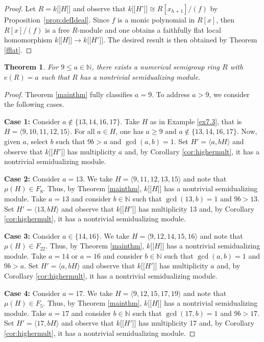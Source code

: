\documentclass{amsart}
\newcommand{\NN}{\mathbb N}
\newcommand{\ldb}{\mathopen{[\![}} %
\newcommand{\rdb}{\mathclose{]\!]}} %
\theoremstyle{plain}
\newtheorem{theorem}{Theorem}
\theoremstyle{definition}
\numberwithin{theorem}{section}
\numberwithin{equation}{section}
\numberwithin{equation}{theorem}
\begin{document}
\begin{proof} Let $R=k \ldb H \rdb$ and observe that $k \ldb H’ \rdb \cong R[x_{h+1}]/(f)$ by Proposition~\ref{prop:defIdeal}. 
Since $f$ is a monic polynomial in $R[x]$, then $R[x]/(f)$ is a free $R$-module and one obtains a faithfully flat local homomorphism $k \ldb H \rdb \to k \ldb H' \rdb$. The desired result is then obtained by Theorem \ref{fflat}.
\end{proof}


\begin{theorem}\label{cor:allmult}
For $9 \leq a \in \NN$, there exists a numerical semigroup ring $R$ with $e(R) = a$ such that $R$ has a nontrivial semidualizing module.
\end{theorem}

\begin{proof}
Theorem \ref{mainthm} fully classifies $a = 9$. To address $a >9$, we consider the following cases.

{\bf Case 1:} Consider $a \notin \{13,14,16,17\}$. Take $H$ as in Example \ref{ex7.3}, that is $H = \langle 9, 10, 11, 12, 15 \rangle$. For all $a \in H$, one has $a \geq 9$ and $a \notin \{13, 14, 16, 17\}$. Now, given $a$, select $b$ such that $9b > a$ and $\gcd(a,b) = 1$. Set $H' = \langle a, bH \rangle$ and observe that $k \ldb H' \rdb$ has multiplicity $a$ and, by Corollary \ref{cor:highermult}, it has a nontrivial semidualizing module.

{\bf Case 2:} Consider $a = 13$. We take $H = \langle 9, 11, 12, 13, 15 \rangle$ and note that $\mu(H) \in F_8$. Thus, by Theorem \ref{mainthm}, $k \ldb H \rdb$ has a nontrivial semidualizing module. Take $a = 13$ and consider $b \in \NN$ such that $\gcd(13,b) = 1$ and $9b > 13$. Set $H' = \langle 13, bH \rangle$ and observe that $k \ldb H' \rdb$ has multiplicity 13 and, by Corollary \ref{cor:highermult}, it has a nontrivial semidualizing module.

{\bf Case 3:} Consider $a \in \{14, 16\}$. We take $H =  \langle 9, 12, 14, 15, 16 \rangle$ and note that $\mu(H) \in F_{22}$. Thus, by Theorem \ref{mainthm}, $k \ldb H \rdb$ has a nontrivial semidualizing module. Take $a = 14$ or $a = 16$ and consider $b \in \NN$ such that $\gcd(a,b) = 1$ and $9b > a$. Set $H' = \langle a, bH \rangle$ and observe that $k \ldb H' \rdb$ has multiplicity $a$ and, by Corollary \ref{cor:highermult}, it has a nontrivial semidualizing module.

{\bf Case 4:} Consider $a = 17$. We take $H = \langle 9, 12, 15, 17, 19 \rangle$ and note that $\mu(H) \in F_5$. Thus, by Theorem \ref{mainthm}, $k \ldb H \rdb$ has a nontrivial semidualizing module. Take $a = 17$ and consider $b \in \NN$ such that $\gcd(17,b) = 1$ and $9b > 17$. Set $H' = \langle 17, bH \rangle$ and observe that $k\ldb H' \rdb$ has multiplicity 17 and, by Corollary \ref{cor:highermult}, it has a nontrivial semidualizing module.
\end{proof}
\end{document}
